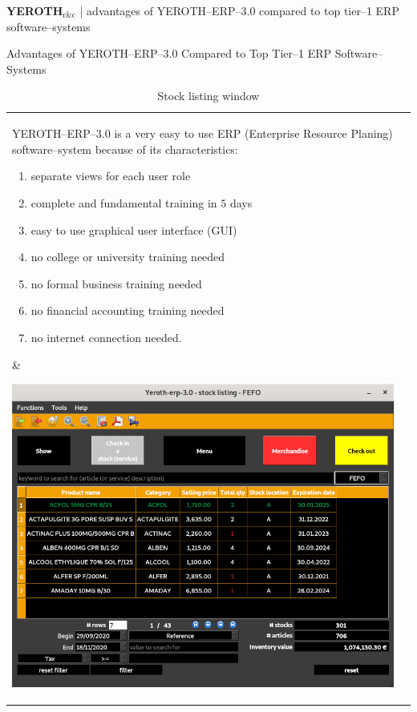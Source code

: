 \documentclass[12pt, a4paper]{article}
\newcommand{\yerothrc}{\textcolor{yerothColorGreen}
			{\textsc{\textcolor{yerothColorRed}{YEROTH}}$_{\text{r\&c}}$\xspace}}
\newcommand{\yerotherpblack}{YEROTH--ERP--$3.0$\xspace}
\begin{document}
{\bf \Large \yerothrc} {| \sc \scriptsize advantages of \yerotherpblack compared
				to top tier--1 ERP software--systems}

\vspace{2.5em}

\parbox{27em}{\LARGE Advantages of \yerotherpblack Compared
				to Top Tier--1 ERP Software--Systems}

\vspace{0.5em}

\begin{table}[!htbp]
\begin{tabular}{ll}
\parbox{27em}{
\yerotherpblack is a very easy to use ERP (Enterprise Resource Planing)
software--system because of its characteristics:
\vspace{0.5em}
\begin{enumerate}[1.]
	\itemsep 0.2em
	\item separate views for each user role
	\item complete and fundamental training in $5$ days
	\item easy to use graphical user interface (GUI)
	\item no college or university training needed
	\item no formal business training needed
	\item no financial accounting training needed
	\item no internet connection needed.\\
\end{enumerate}
}

&

\parbox{15em}{
\begin{center}
\includegraphics[scale=0.25]{images/yeroth-stock-listing-window.png}
\caption*{Stock listing window}
\end{center}
}
\end{tabular}
\end{table}
\end{document}
